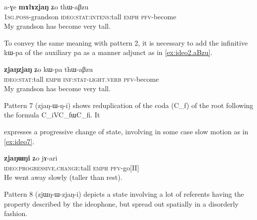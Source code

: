 \documentclass[oldfontcommands,oneside,a4paper,11pt]{article}
\newcommand{\ipa}[1]{{\phon \mbox{#1}}} %
\begin{document}
 \begin{exe} 
\ex  \label{ex:ideo6}
\gll
\ipa{a-ɣe}  	\ipa{\textbf{mɤlɤzjaŋ}}  	\ipa{ʑo}  	\ipa{thɯ-aβzu}  \\
\textsc{1sg.poss}-grandson \textsc{ideo:stat:intens}:tall \textsc{emph} \textsc{pfv}-become \\
\glt My grandson has become very tall.
 \end{exe}

To convey the same meaning with pattern 2, it is necessary to add the infinitive   	\ipa{kɯ-pa} of the auxiliary \ipa{pa} as a manner adjunct as in \ref{ex:ideo2.aBzu}.
 
 \begin{exe} 
\ex  \label{ex:ideo2.aBzu}
\gll 
 \ipa{\textbf{zjaŋzjaŋ}}  	\ipa{ʑo}  	\ipa{kɯ-pa}  	\ipa{thɯ-aβzu}  \\
  \textsc{ideo:stat}:tall \textsc{emph} \textsc{inf:stat}-\textsc{light.verb} \textsc{pfv}-become \\
\glt My grandson has become very tall.
 \end{exe}
 
 Pattern 7 (\ipa{zjaŋ-ɯ-ŋ-i}) shows   reduplication of the coda (C_f) of the root following the formula C_iVC_f\ipa{ɯ}C_f\ipa{i}. It
 
 
  expresses a progressive change of state, involving in some case slow motion as in \ref{ex:ideo7}.
 
  \begin{exe} 
\ex  \label{ex:ideo7}
\gll 
\ipa{\textbf{zjaŋɯŋi}}  	\ipa{ʑo}  	\ipa{jɤ-ari}  \\
  \textsc{ideo:progressive.change}:tall  \textsc{emph} \textsc{pfv}-go[II] \\
\glt He went away slowly (taller than rest).
 \end{exe}


Pattern 8 (\ipa{zjɯŋ-ɯ-zjaŋ-i}) depicts a state involving a lot of referents having the property described by the ideophone, but spread out spatially in a disorderly fashion. 
	
\end{document}

